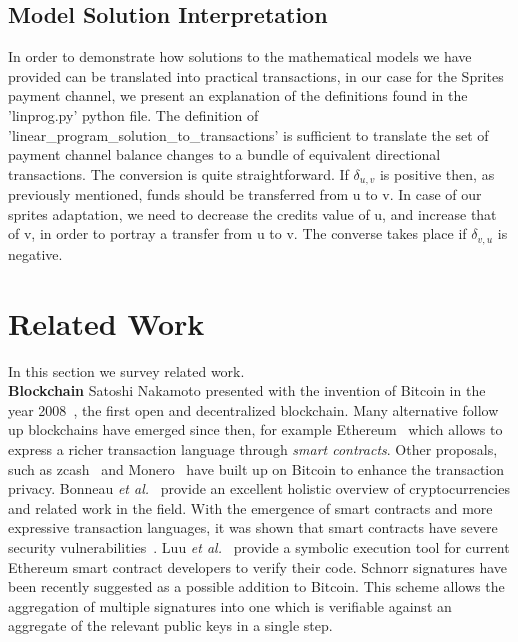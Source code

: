 \documentclass[sigconf]{acmart}
\begin{document}
\subsection{Model Solution Interpretation}

In order to demonstrate how solutions to the mathematical models we have provided can be translated into practical transactions, in our case for the Sprites payment channel, we present an explanation of the definitions found in the 'linprog.py' python file.
The definition of 'linear\_program\_solution\_to\_transactions' is sufficient to translate the set of payment channel balance changes to a bundle of equivalent directional transactions.
The conversion is quite straightforward. If $\delta_{u,v}$ is positive then, as previously mentioned, funds should be transferred from u to v. In case of our sprites adaptation, we need to decrease the credits value of u, and increase that of v, in order to portray a transfer from u to v. The converse takes place if $\delta_{v,u}$ is negative.

\section{Related Work}
\label{sec:relatedwork}
In this section we survey related work.\\


\noindent
\textbf{Blockchain} Satoshi Nakamoto presented with the invention of Bitcoin in the year 2008~\cite{nakamoto2008bitcoin}, the first open and decentralized blockchain. Many alternative follow up blockchains have emerged since then, for example Ethereum~\cite{wood2014ethereum} which allows to express a richer transaction language through \emph{smart contracts}. Other proposals, such as zcash~\cite{sasson2014zerocash} and Monero~\cite{van2013cryptonote} have built up on Bitcoin to enhance the transaction privacy. Bonneau \emph{et al.}~\cite{bonneau2015sok} provide an excellent holistic overview of cryptocurrencies and related work in the field.
With the emergence of smart contracts and more expressive transaction languages, it was shown that smart contracts have severe security vulnerabilities~\cite{atzei2016survey}. Luu \emph{et al.}~\cite{luu2016making} provide a symbolic execution tool for current Ethereum smart contract developers to verify their code.
Schnorr signatures\cite{Schnorr:1991:ESG:2724954.2725006} have been recently suggested as a possible addition to Bitcoin\cite{scalingbitcoinschnorr}. This scheme allows the aggregation of multiple signatures into one which is verifiable against an aggregate of the relevant public keys in a single step. 
\\
\end{document}
